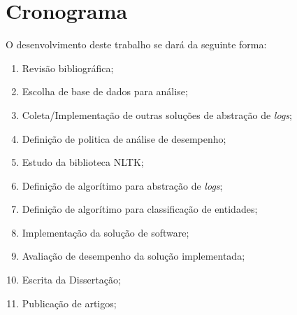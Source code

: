 \documentclass[
	12pt,				%
	openright,			%
	twoside,			%
	a4paper,			%
	english,			%
	spanish,			%
	brazil,				%
	]{abntex2}
\begin{document}
\chapter{Cronograma}\label{chap:cronograma}
O desenvolvimento deste trabalho se dará da seguinte forma:

\begin{enumerate}
	\item \label{rev-bibli} Revisão bibliográfica;
	\item \label{esc-base} Escolha de base de dados para análise;
	\item \label{imp-outras} Coleta/Implementação de outras soluções de abstração de \emph{logs};
	\item \label{def-pol} Definição de politica de análise de desempenho;
	\item \label{est-nltk} Estudo da biblioteca NLTK;
	\item \label{algo-abs} Definição de algorítimo para abstração de \emph{logs};
	\item \label{algo-clas} Definição de algorítimo para classificação de entidades;
	\item \label{imp-sol} Implementação da solução de software;
	\item \label{ava-des} Avaliação de desempenho da solução implementada;
	\item \label{esc-dis} Escrita da Dissertação;
	\item \label{pub-art} Publicação de artigos;	
\end{enumerate}
\end{document}
